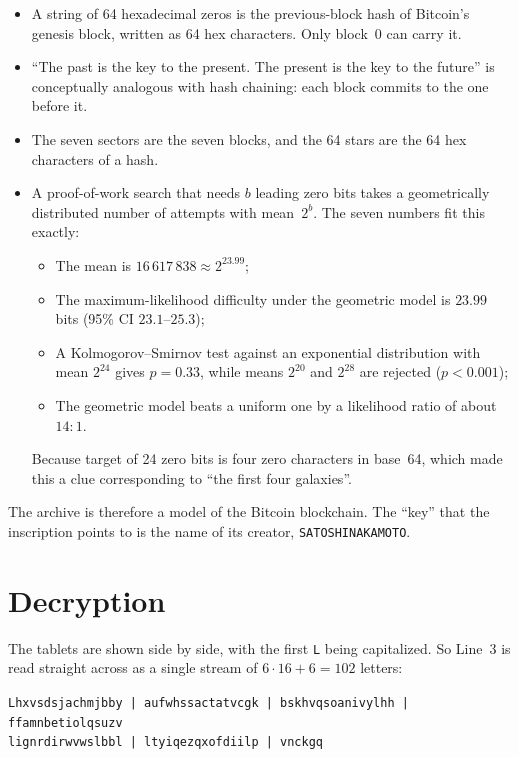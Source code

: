 \documentclass[11pt,a4paper]{article}
\newcommand{\tx}[1]{\texttt{#1}}
\begin{document}
\begin{itemize}
  \item A string of 64 hexadecimal zeros is the
  previous-block hash of Bitcoin's genesis block, written as 64 hex characters.
  Only block~0 can carry it.
  \item ``The past is the key to the present. The
  present is the key to the future'' is conceptually analogous with hash chaining: each block
  commits to the one before it.
  \item The seven
  sectors are the seven blocks, and the 64 stars are the 64 hex characters of
  a hash.
  \item A proof-of-work search that
  needs $b$ leading zero bits takes a geometrically distributed number of
  attempts with mean~$2^b$. The seven numbers fit this exactly:
  \begin{itemize}
    \item The mean is $16\,617\,838 \approx 2^{23.99}$;
    \item The maximum-likelihood difficulty under the geometric model is
    $23.99$ bits (95\% CI $23.1$--$25.3$);
    \item A Kolmogorov--Smirnov test against an exponential distribution with
    mean $2^{24}$ gives $p=0.33$, while means $2^{20}$ and $2^{28}$ are
    rejected ($p<0.001$);
    \item The geometric model beats a uniform one by a likelihood ratio of
    about $14:1$.
  \end{itemize}
  Because target of 24 zero bits is four zero characters in base~64, which made this a clue corresponding to ``the first four galaxies''.
\end{itemize}

The archive is therefore a model of the Bitcoin blockchain. The ``key'' that
the inscription points to is the name of its creator, \tx{SATOSHINAKAMOTO}.

\section{Decryption}

The tablets are shown side by side, with the first \tx{L} being capitalized. So Line~3 is read straight across as a
single stream of $6\cdot 16+6=102$ letters:
\begin{center}
\tx{Lhxvsdsjachmjbby | aufwhssactatvcgk | bskhvqsoanivylhh | ffamnbetiolqsuzv}\\
\tx{lignrdirwvwslbbl | ltyiqezqxofdiilp | vnckgq}
\end{center}
\end{document}
